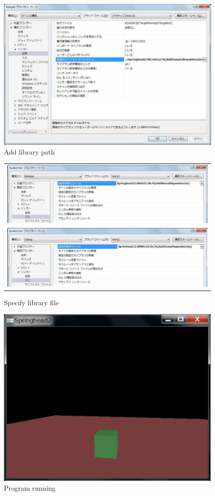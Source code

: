 \begin{figure}[t]
\begin{center}
\includegraphics[width=.6\hsize]{fig/newproject5.eps}
\end{center}
\caption{Add library path}
\label{fig_newproject5}
\end{figure}

\begin{figure}[t]
\begin{center}
\begin{tabular}{c}
\includegraphics[width=.6\hsize]{fig/newproject6_truncate.eps} \\
\includegraphics[width=.6\hsize]{fig/newproject7_truncate.eps}
\end{tabular}
\end{center}
\caption{Specify library file}
\label{fig_newproject6}
\end{figure}

\begin{figure}[t]
\begin{center}
\includegraphics[width=.6\hsize]{fig/newproject8.eps}
\end{center}
\caption{Program running}
\label{fig_newproject8}
\end{figure}


